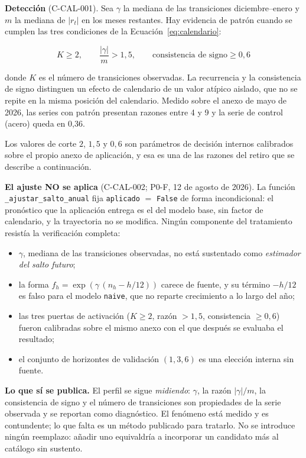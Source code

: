 \documentclass[12pt]{article}
\begin{document}
\textbf{Detecci\'on} (C-CAL-001). Sea $\gamma$ la mediana de las transiciones diciembre--enero y $m$ la mediana de $|r_t|$ en los meses restantes. Hay evidencia de patr\'on cuando se cumplen las tres condiciones de la Ecuaci\'on~\ref{eq:calendario}:

\begin{equation}
K \geq 2, \qquad \frac{|\gamma|}{m} > 1{,}5, \qquad \text{consistencia de signo} \geq 0{,}6
\label{eq:calendario}
\end{equation}

donde $K$ es el n\'umero de transiciones observadas. La recurrencia y la consistencia de signo distinguen un efecto de calendario de un valor at\'ipico aislado, que no se repite en la misma posici\'on del calendario. Medido sobre el anexo de mayo de 2026, las series con patr\'on presentan razones entre 4 y 9 y la serie de control (acero) queda en 0{,}36.

Los valores de corte $2$, $1{,}5$ y $0{,}6$ son par\'ametros de decisi\'on internos calibrados sobre el propio anexo de aplicaci\'on, y esa es una de las razones del retiro que se describe a continuaci\'on.

\textbf{El ajuste NO se aplica} (C-CAL-002; P0-F, 12 de agosto de 2026). La funci\'on \texttt{\_ajustar\_salto\_anual} fija \texttt{aplicado} $=$ \texttt{False} de forma incondicional: el pron\'ostico que la aplicaci\'on entrega es el del modelo base, sin factor de calendario, y la trayectoria no se modifica. Ning\'un componente del tratamiento resist\'ia la verificaci\'on completa:

\begin{itemize}
  \item $\gamma$, mediana de las transiciones observadas, no est\'a sustentado como \emph{estimador del salto futuro};
  \item la forma $f_h = \exp(\gamma\,(n_h - h/12))$ carece de fuente, y su t\'ermino $-h/12$ es falso para el modelo \texttt{naive}, que no reparte crecimiento a lo largo del a\~no;
  \item las tres puertas de activaci\'on ($K \geq 2$, raz\'on $> 1{,}5$, consistencia $\geq 0{,}6$) fueron calibradas sobre el mismo anexo con el que despu\'es se evaluaba el resultado;
  \item el conjunto de horizontes de validaci\'on $(1,3,6)$ es una elecci\'on interna sin fuente.
\end{itemize}

\textbf{Lo que s\'i se publica.} El perfil se sigue \emph{midiendo}: $\gamma$, la raz\'on $|\gamma|/m$, la consistencia de signo y el n\'umero de transiciones son propiedades de la serie observada y se reportan como diagn\'ostico. El fen\'omeno est\'a medido y es contundente; lo que falta es un m\'etodo publicado para tratarlo. No se introduce ning\'un reemplazo: a\~nadir uno equivaldr\'ia a incorporar un candidato m\'as al cat\'alogo sin sustento.
\end{document}
